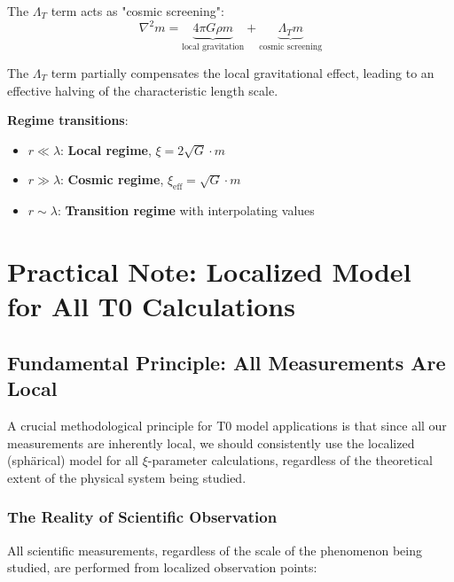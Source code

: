 \documentclass[12pt,a4paper]{article}
\begin{document}
	\begin{tcolorbox}[colback=blue!5!white,colframe=blue!75!black,title=Cosmic Screening Mechanism]
		The $\Lambda_T$ term acts as "cosmic screening":
		\begin{equation}
			\nabla^2 m = \underbrace{4\pi G \rho m}_{\text{local gravitation}} + \underbrace{\Lambda_T m}_{\text{cosmic screening}}
		\end{equation}
		
		The $\Lambda_T$ term partially compensates the local gravitational effect, leading to an effective halving of the characteristic length scale.
	\end{tcolorbox}
	
	\textbf{Regime transitions}:
	\begin{itemize}
		\item $r \ll \lambda$: \textbf{Local regime}, $\xi = 2\sqrt{G} \cdot m$
		\item $r \gg \lambda$: \textbf{Cosmic regime}, $\xi_{\text{eff}} = \sqrt{G} \cdot m$
		\item $r \sim \lambda$: \textbf{Transition regime} with interpolating values
	\end{itemize}
\section{Practical Note: Localized Model for All T0 Calculations}
\label{sec:localized_model_universal}

\subsection{Fundamental Principle: All Measurements Are Local}
\label{subsec:all_measurements_local}

A crucial methodological principle for T0 model applications is that since all our measurements are inherently local, we should consistently use the localized (sphärical) model for all $\xi$-parameter calculations, regardless of the theoretical extent of the physical system being studied.

\subsubsection{The Reality of Scientific Observation}
\label{subsubsec:reality_scientific_observation}

All scientific measurements, regardless of the scale of the phenomenon being studied, are performed from localized observation points:
\end{document}

